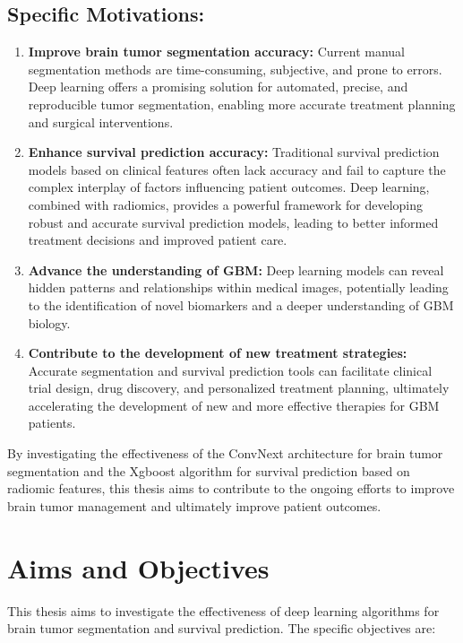 \documentclass[12pt,oneside]{report}
\begin{document}
\subsection{Specific Motivations:}
\begin{enumerate}
\item \textbf{Improve brain tumor segmentation accuracy:} Current manual segmentation methods are time-consuming, subjective, and prone to errors. Deep learning offers a promising solution for automated, precise, and reproducible tumor segmentation, enabling more accurate treatment planning and surgical interventions.

\item \textbf{Enhance survival prediction accuracy:} Traditional survival prediction models based on clinical features often lack accuracy and fail to capture the complex interplay of factors influencing patient outcomes. Deep learning, combined with radiomics, provides a powerful framework for developing robust and accurate survival prediction models, leading to better informed treatment decisions and improved patient care.

\item \textbf{Advance the understanding of GBM:} Deep learning models can reveal hidden patterns and relationships within medical images, potentially leading to the identification of novel biomarkers and a deeper understanding of GBM biology.

\item \textbf{Contribute to the development of new treatment strategies:} Accurate segmentation and survival prediction tools can facilitate clinical trial design, drug discovery, and personalized treatment planning, ultimately accelerating the development of new and more effective therapies for GBM patients.

\end{enumerate}

By investigating the effectiveness of the ConvNext architecture for brain tumor segmentation and the Xgboost algorithm for survival prediction based on radiomic features, this thesis aims to contribute to the ongoing efforts to improve brain tumor management and ultimately improve patient outcomes.

\section{Aims and Objectives}
This thesis aims to investigate the effectiveness of deep learning algorithms for brain tumor segmentation and survival prediction. The specific objectives are:
\end{document}

